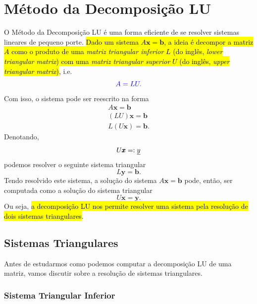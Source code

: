 \section{Método da Decomposição LU}\label{cap_sislin_sec_lu}

O Método da Decomposição LU é uma forma eficiente de se resolver sistemas lineares de pequeno porte. \hl{Dado um sistema $A\pmb{x} = \pmb{b}$, a ideia é decompor a matriz $A$ como o produto de uma \emph{matriz triangular inferior} $L$ (do inglês, \textit{lower triangular matrix}) com uma \emph{matriz triangular superior} $U$ (do inglês, \textit{upper triangular matrix})}, i.e.
\begin{equation}
  \color{blue}A = LU.
\end{equation}
Com isso, o sistema pode ser reescrito na forma
\begin{gather}
  A\pmb{x} = \pmb{b}\\
  (LU)\pmb{x} = \pmb{b}\\
  L(U\pmb{x}) = \pmb{b}.
\end{gather}
Denotando,
\begin{equation}
  U\pmb{x} =: \emph{y}
\end{equation}
podemos resolver o seguinte sistema triangular
\begin{equation}
  L\pmb{y} = \pmb{b}.
\end{equation}
Tendo resolvido este sistema, a solução do sistema $A\pmb{x} = \pmb{b}$ pode, então, ser computada como a solução do sistema triangular
\begin{equation}
  U\pmb{x} = \pmb{y}.
\end{equation}
Ou seja, \hl{a decomposição LU nos permite resolver uma sistema pela resolução de dois sistemas triangulares}.

\subsection{Sistemas Triangulares}

Antes de estudarmos como podemos computar a decomposição LU de uma matriz, vamos discutir sobre a resolução de sistemas triangulares.

\subsubsection{Sistema Triangular Inferior}

